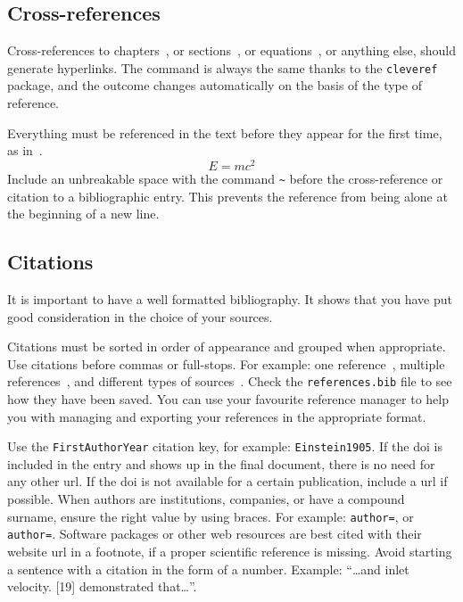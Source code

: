 \subsection{Cross-references}
Cross-references to chapters~, or sections~, or equations~, or anything else, should generate hyperlinks.
The command is always the same thanks to the \texttt{cleveref} package, and the outcome changes automatically on the basis of the type of reference.


Everything must be referenced in the text before they appear for the first time, as in~.
%
\begin{equation}
    E = mc^2
    \label{eq:energy}
\end{equation}
%
Include an unbreakable space with the command \texttt{\~} before the cross-reference or citation to a bibliographic entry. 
This prevents the reference from being alone at the beginning of a new line.



\subsection{Citations}
It is important to have a well formatted bibliography. It shows that you have put good consideration in the choice of your sources.


Citations must be sorted in order of appearance and grouped when appropriate.
Use citations before commas or full-stops.
For example: one reference~\cite{Varriale2025}, multiple references~\cite{Varriale2021, Varriale2021a, Varriale2019a}, and different types of sources~\cite{Zilver2025, deZoeten2023, Stickle1968, Pinsker1968}.
%
Check the \texttt{references.bib} file to see how they have been saved.
You can use your favourite reference manager to help you with managing and exporting your references in the appropriate format.


Use the \texttt{FirstAuthorYear} citation key, for example: \texttt{Einstein1905}.
If the \gls{doi} is included in the entry and shows up in the final document, there is no need for any other \gls{url}. 
If the \gls{doi} is not available for a certain publication, include a \gls{url} if possible. 
When authors are institutions, companies, or have a compound surname, ensure  the right value by using braces. 
For example: \texttt{author=}, or \texttt{author=}.
Software packages or other web resources are best cited with their website \gls{url} in a footnote, if a proper scientific reference is missing.
Avoid starting a sentence with a citation in the form of a number. Example: ``\ldots and inlet velocity. [19] demonstrated that\ldots ''.






